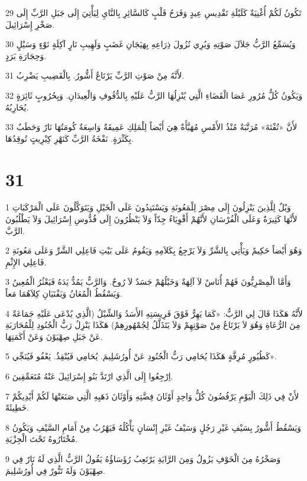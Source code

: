 \par 29 تَكُونُ لَكُمْ أُغْنِيَةٌ كَلَيْلَةِ تَقْدِيسِ عِيدٍ وَفَرَحُ قَلْبٍ كَالسَّائِرِ بِالنَّايِ لِيَأْتِيَ إِلَى جَبَلِ الرَّبِّ إِلَى صَخْرِ إِسْرَائِيلَ.
\par 30 وَيُسَمِّعُ الرَّبُّ جَلاَلَ صَوْتِهِ وَيُرِي نُزُولَ ذِرَاعِهِ بِهَيَجَانِ غَضَبٍ وَلَهِيبِ نَارٍ آكِلَةٍ نَوْءٍ وَسَيْلٍ وَحِجَارَةِ بَرَدٍ.
\par 31 لأَنَّهُ مِنْ صَوْتِ الرَّبِّ يَرْتَاعُ أَشُّورُ. بِالْقَضِيبِ يَضْرِبُ.
\par 32 وَيَكُونُ كُلُّ مُرُورِ عَصَا الْقَضَاءِ الَّتِي يُنْزِلُهَا الرَّبُّ عَلَيْهِ بِالدُّفُوفِ وَالْعِيدَانِ. وَبِحُرُوبٍ ثَائِرَةٍ يُحَارِبُهُ.
\par 33 لأَنَّ «تُفْتَةَ» مُرَتَّبَةٌ مُنْذُ الأَمْسِ مُهَيَّأَةٌ هِيَ أَيْضاً لِلْمَلِكِ عَمِيقَةٌ وَاسِعَةٌ كُومَتُهَا نَارٌ وَحَطَبٌ بِكَثْرَةٍ. نَفْخَةُ الرَّبِّ كَنَهْرِ كِبْرِيتٍ تُوقِدُهَا.

\chapter{31}

\par 1 وَيْلٌ لِلَّذِينَ يَنْزِلُونَ إِلَى مِصْرَ لِلْمَعُونَةِ وَيَسْتَنِدُونَ عَلَى الْخَيْلِ وَيَتَوَكَّلُونَ عَلَى الْمَرْكَبَاتِ لأَنَّهَا كَثِيرَةٌ وَعَلَى الْفُرْسَانِ لأَنَّهُمْ أَقْوِيَاءُ جِدّاً وَلاَ يَنْظُرُونَ إِلَى قُدُّوسِ إِسْرَائِيلَ وَلاَ يَطْلُبُونَ الرَّبَّ.
\par 2 وَهُوَ أَيْضاً حَكِيمٌ وَيَأْتِي بِالشَّرِّ وَلاَ يَرْجِعُ بِكَلاَمِهِ وَيَقُومُ عَلَى بَيْتِ فَاعِلِي الشَّرِّ وَعَلَى مَعُونَةِ فَاعِلِي الإِثْمِ.
\par 3 وَأَمَّا الْمِصْرِيُّونَ فَهُمْ أُنَاسٌ لاَ آلِهَةٌ وَخَيْلُهُمْ جَسَدٌ لاَ رُوحٌ. وَالرَّبُّ يَمُدُّ يَدَهُ فَيَعْثُرُ الْمُعِينُ وَيَسْقُطُ الْمُعَانُ وَيَفْنَيَانِ كِلاَهُمَا مَعاً.
\par 4 لأَنَّهُ هَكَذَا قَالَ لِي الرَّبُّ: «كَمَا يَهِرُّ فَوْقَ فَرِيسَتِهِ الأَسَدُ وَالشِّبْلُ (الَّذِي يُدْعَى عَلَيْهِ جَمَاعَةٌ مِنَ الرُّعَاةِ وَهُوَ لاَ يَرْتَاعُ مِنْ صَوْتِهِمْ وَلاَ يَتَذَلَّلُ لِجُمْهُورِهِمْ) هَكَذَا يَنْزِلُ رَبُّ الْجُنُودِ لِلْمُحَارَبَةِ عَنْ جَبَلِ صِهْيَوْنَ وَعَنْ أَكَمَتِهَا.
\par 5 كَطُيُورٍ مُرِفَّةٍ هَكَذَا يُحَامِي رَبُّ الْجُنُودِ عَنْ أُورُشَلِيمَ. يُحَامِي فَيُنْقِذُ. يَعْفُو فَيُنَجِّي».
\par 6 اِرْجِعُوا إِلَى الَّذِي ارْتَدَّ بَنُو إِسْرَائِيلَ عَنْهُ مُتَعَمِّقِينَ.
\par 7 لأَنْ فِي ذَلِكَ الْيَوْمِ يَرْفُضُونَ كُلُّ وَاحِدٍ أَوْثَانَ فِضَّتِهِ وَأَوْثَانَ ذَهَبِهِ الَّتِي صَنَعَتْهَا لَكُمْ أَيْدِيكُمْ خَطِيئَةً.
\par 8 وَيَسْقُطُ أَشُّورُ بِسَيْفِ غَيْرِ رَجُلٍ وَسَيْفُ غَيْرِ إِنْسَانٍ يَأْكُلُهُ فَيَهْرُبُ مِنْ أَمَامِ السَّيْفِ وَيَكُونُ مُخْتَارُوهُ تَحْتَ الْجِزْيَةِ.
\par 9 وَصَخْرُهُ مِنَ الْخَوْفِ يَزُولُ وَمِنَ الرَّايَةِ يَرْتَعِبُ رُؤَسَاؤُهُ يَقُولُ الرَّبُّ الَّذِي لَهُ نَارٌ فِي صِهْيَوْنَ وَلَهُ تَنُّورٌ فِي أُورُشَلِيمَ.

